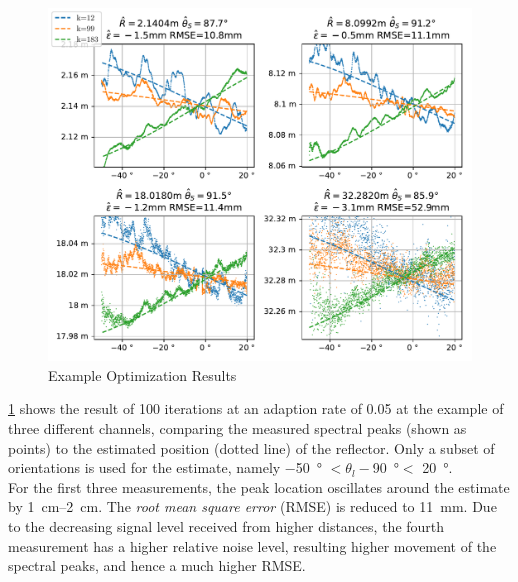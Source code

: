 \begin{figure}[h]
  \centering
  \includegraphics[width=\textwidth]{../figures/reflpos_estimate.pdf}
  \caption{Example Optimization Results}
  \label{fig:reflpos_estimate}
\end{figure}

\cref{fig:reflpos_estimate} shows the result of 100 iterations at an adaption rate of 0.05 at the example of three different channels,
comparing the measured spectral peaks (shown as points) to the estimated position (dotted line) of the reflector.
Only a subset of orientations is used for the estimate,
namely \SI{-50}{\degree} $<\theta_l-$\SI{90}{\degree}$<$ \SI{20}{\degree}. \\

For the first three measurements, the peak location oscillates around the estimate by \SIrange[range-units=single]{1}{2}{\cm}.
The \emph{root mean square error} (RMSE) is reduced to \SI{11}{\mm}.
Due to the decreasing signal level received from higher distances,
the fourth measurement has a higher relative noise level, resulting higher movement of the spectral peaks, and hence a much higher RMSE.

\newpage


